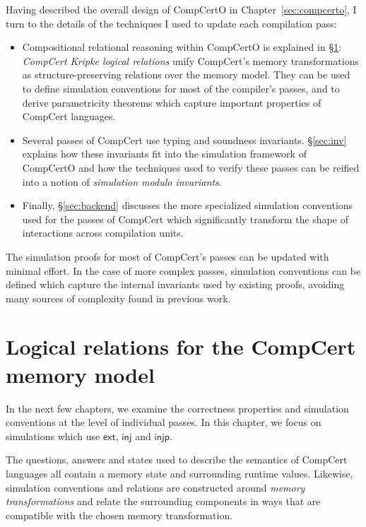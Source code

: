 \documentclass[11pt,oneside,draft]{book}
\theoremstyle{definition}
\newcommand{\kw}[1]{\ensuremath{ \mathsf{#1} }}
\begin{document}
Having described the overall design of CompCertO
in Chapter~\ref{sec:compcerto},
I turn to the details of the techniques
I used to update each compilation pass:
\begin{itemize}
\item
  Compositional relational reasoning within CompCertO
  is explained in \S\ref{sec:cklr}:
  \emph{CompCert Kripke logical relations}
  unify CompCert's memory transformations
  as structure-preserving relations
  over the memory model.
  They can be used to define simulation conventions
  for most of the compiler's passes,
  and to derive parametricity theorems which capture
  important properties of CompCert languages.
\item
  Several passes of CompCert use
  typing and soundness invariants.
  \S\ref{sec:inv} explains how these invariants fit
  into the simulation framework of CompCertO and
  how the techniques used to verify these passes
  can be reified into a notion of
  \emph{simulation modulo invariants}.
\item
  Finally, \S\ref{sec:backend}
  discusses the more specialized simulation conventions
  used for the passes of CompCert which significantly transform
  the shape of interactions across compilation units.
\end{itemize}

The simulation proofs for
most of CompCert's passes
can be updated with minimal effort.
In the case of more complex passes,
simulation conventions can be defined
which capture the internal invariants
used by existing proofs,
avoiding many sources of complexity found
in previous work.

\section{Logical relations for the CompCert memory model} \label{sec:cklr} %

In the next few chapters,
we examine the correctness properties
and simulation conventions
at the level of individual passes.
In this chapter,
we focus on simulations which use
$\kw{ext}$, $\kw{inj}$ and $\kw{injp}$.

The questions, answers and states
used to describe the semantics of CompCert languages all contain
a memory state and surrounding runtime values.
Likewise, simulation conventions and relations
are constructed around \emph{memory transformations}
and relate the surrounding components in ways that %
are compatible with the chosen memory transformation.
\end{document}

